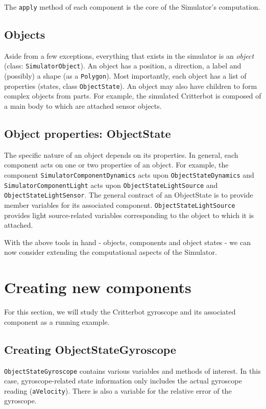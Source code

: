\documentclass[12pt]{article}
\newcommand{\code}[1]{\texttt{#1}}
\newcommand{\keyword}[1]{\textit{#1}}
\begin{document}
The \code{apply} method of each component is the core of the Simulator's
computation.

\subsection{Objects}

Aside from a few exceptions, everything that exists in the simulator is an
\keyword{object} (class: \code{SimulatorObject}). An object has a position,
a direction, a label and (possibly) a shape (as a \code{Polygon}). Most 
importantly, each object has a list of properties (states, class 
\code{ObjectState}). An object may also have children to form complex objects
from parts. For example, the simulated Critterbot is composed of a main body
to which are attached sensor objects.

\subsection{Object properties: ObjectState}

The specific nature of an object depends on its properties. In general, each
component acts on one or two properties of an object. For example, the 
component \code{SimulatorComponentDynamics} acts upon 
\code{ObjectStateDynamics} and \code{SimulatorComponentLight} acts upon
\code{ObjectStateLightSource} and \code{ObjectStateLightSensor}. The general
contract of an ObjectState is to provide member variables for its associated
component. \code{ObjectStateLightSource} provides light source-related 
variables corresponding to the object to which it is attached.


With the above tools in hand - objects, components and object states - we
can now consider extending the computational aspects of the Simulator.

\section{Creating new components}

For this section, we will study the Critterbot gyroscope and its associated
component as a running example.

\subsection{Creating ObjectStateGyroscope}

\code{ObjectStateGyroscope} contains various variables and methods of interest.
In this case, gyroscope-related state information only includes the actual 
gyroscope reading (\code{aVelocity}). There is also a variable for the 
relative error of the gyroscope.
\end{document}
